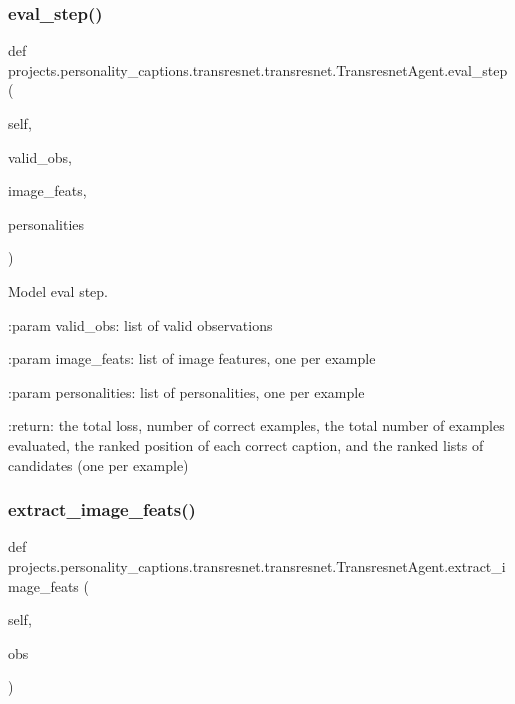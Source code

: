 \subsubsection{\texorpdfstring{eval\+\_\+step()}{eval\_step()}}
{\footnotesize\ttfamily def projects.\+personality\+\_\+captions.\+transresnet.\+transresnet.\+Transresnet\+Agent.\+eval\+\_\+step (\begin{DoxyParamCaption}\item[{}]{self,  }\item[{}]{valid\+\_\+obs,  }\item[{}]{image\+\_\+feats,  }\item[{}]{personalities }\end{DoxyParamCaption})}

\begin{DoxyVerb}Model eval step.

:param valid_obs:
    list of valid observations

:param image_feats:
    list of image features, one per example

:param personalities:
    list of personalities, one per example

:return:
    the total loss, number of correct examples, the total number of
    examples evaluated, the ranked position of each correct caption,
    and the ranked lists of candidates (one per example)
\end{DoxyVerb}
 \mbox{\label{classprojects_1_1personality__captions_1_1transresnet_1_1transresnet_1_1TransresnetAgent_acd07a9e73c6f58600c0db97331ff26f4}} 
\subsubsection{\texorpdfstring{extract\+\_\+image\+\_\+feats()}{extract\_image\_feats()}}
{\footnotesize\ttfamily def projects.\+personality\+\_\+captions.\+transresnet.\+transresnet.\+Transresnet\+Agent.\+extract\+\_\+image\+\_\+feats (\begin{DoxyParamCaption}\item[{}]{self,  }\item[{}]{obs }\end{DoxyParamCaption})}

